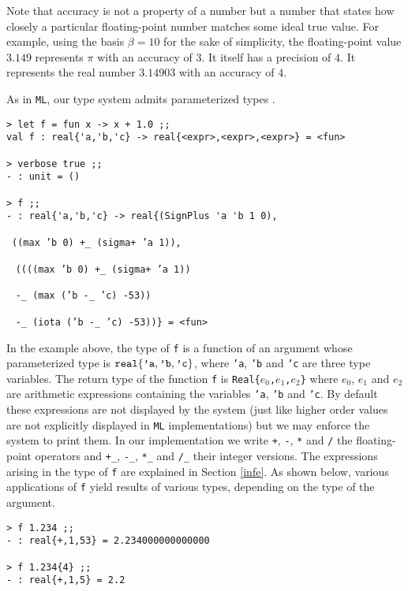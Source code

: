 Note that
accuracy is not a property of a number but  a number that states how closely a particular floating-point number
matches some ideal true value.
For example, using the basis $\beta=10$ for the sake of simplicity, the floating-point value $3.149$ represents $\pi$ with an accuracy of $3$.
It itself has a precision of $4$. It represents the real number $3.14903$
with an accuracy of $4$. 


As in \texttt{ML}, our type system admits parameterized types \cite{Pie02}. 
\begin{verbatim}
> let f = fun x -> x + 1.0 ;;
val f : real{'a,'b,'c} -> real{<expr>,<expr>,<expr>} = <fun>

> verbose true ;;
- : unit = ()

> f ;;
- : real{'a,'b,'c} -> real{(SignPlus 'a 'b 1 0),
\end{verbatim}
\ \hspace{4.55cm}\texttt{((max 'b 0) +\_ (sigma+ 'a 1)),}

~ \hspace{4.2cm}\texttt{((((max 'b 0) +\_ (sigma+ 'a 1)) }

~ \hspace{4.6cm}\texttt{-\_ (max ('b -\_ 'c) -53))} 

~ \hspace{4.2cm}\texttt{-\_ (iota ('b -\_ 'c) -53))\} = <fun>}

\smallskip

In the example above, the type of \texttt{f} is a function of an argument whose parameterized type is $\mathtt{real\{\texttt{'a},\texttt{'b},\texttt{'c}\}}$, where
\texttt{'a}, \texttt{'b} and \texttt{'c} are three type variables. The return type of the function
 \texttt{f} is \texttt{Real\{}$e_0$\texttt{,}$e_1$\texttt{,}$e_2$\texttt{\}} 
where $e_0$, $e_1$ and $e_2$ are arithmetic expressions
containing the variables \texttt{'a}, \texttt{'b} and \texttt{'c}. By default these expressions are not displayed by the system (just like higher order values are not explicitly
displayed in \texttt{ML} implementations) but we may enforce the system to print them. In our implementation we write \texttt{+}, \texttt{-}, \texttt{*} and
\texttt{/} the floating-point operators and \texttt{+\_}, \texttt{-\_}, \texttt{*\_} and
\texttt{/\_} their integer versions. The expressions arising in the type of \texttt{f} are explained in Section \ref{infe}. As shown below, various
applications of \texttt{f} yield results of various types, depending on the type of the argument.
\begin{verbatim}
> f 1.234 ;;
- : real{+,1,53} = 2.234000000000000

> f 1.234{4} ;;
- : real{+,1,5} = 2.2
\end{verbatim}

